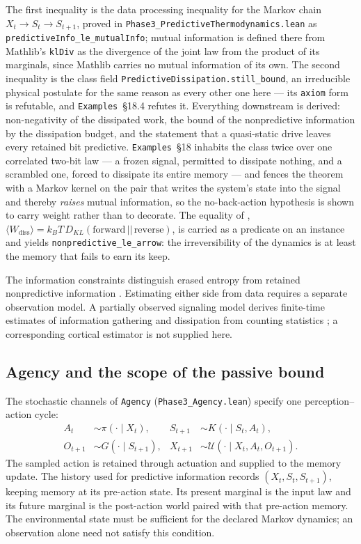 \documentclass{article}
\renewcommand{\cite}[1]{\citep{#1}}
\begin{document}
The first inequality is the data processing inequality for the Markov chain $X_t \to S_t \to S_{t+1}$, proved in \nolinkurl{Phase3_PredictiveThermodynamics.lean} as \nolinkurl{predictiveInfo_le_mutualInfo}; mutual information is defined there from Mathlib's \texttt{klDiv} as the divergence of the joint law from the product of its marginals, since Mathlib carries no mutual information of its own. The second inequality is the class field \nolinkurl{PredictiveDissipation.still_bound}, an irreducible physical postulate for the same reason as every other one here --- its \texttt{axiom} form is refutable, and \texttt{Examples}~\S18.4 refutes it. Everything downstream is derived: non-negativity of the dissipated work, the bound of the nonpredictive information by the dissipation budget, and the statement that a quasi-static drive leaves every retained bit predictive. \texttt{Examples}~\S18 inhabits the class twice over one correlated two-bit law --- a frozen signal, permitted to dissipate nothing, and a scrambled one, forced to dissipate its entire memory --- and fences the theorem with a Markov kernel on the pair that writes the system's state into the signal and thereby \emph{raises} mutual information, so the no-back-action hypothesis is shown to carry weight rather than to decorate. The equality of \cite{kawai2007}, $\langle W_{\mathrm{diss}} \rangle = k_B T\, D_{KL}(\mathrm{forward} \,||\, \mathrm{reverse})$, is carried as a predicate on an instance and yields \nolinkurl{nonpredictive_le_arrow}: the irreversibility of the dynamics is at least the memory that fails to earn its keep.

The information constraints distinguish erased entropy from retained nonpredictive information \cite{rosas2026}. Estimating either side from data requires a separate observation model. A partially observed signaling model derives finite-time estimates of information gathering and dissipation from counting statistics \cite{nicoletti2026}; a corresponding cortical estimator is not supplied here.

\subsection{Agency and the scope of the passive bound}
\label{sec:agency}

The stochastic channels of \texttt{Agency} (\nolinkurl{Phase3_Agency.lean}) specify one perception--action cycle:
\begin{align*}
 A_t&\sim\pi(\cdot\mid X_t),&
 S_{t+1}&\sim K(\cdot\mid S_t,A_t),\\
 O_{t+1}&\sim G(\cdot\mid S_{t+1}),&
 X_{t+1}&\sim \mathcal{U}(\cdot\mid X_t,A_t,O_{t+1}).
\end{align*}
The sampled action is retained through actuation and supplied to the memory update. The history used for predictive information records $(X_t,S_t,S_{t+1})$, keeping memory at its pre-action state. Its present marginal is the input law and its future marginal is the post-action world paired with that pre-action memory. The environmental state must be sufficient for the declared Markov dynamics; an observation alone need not satisfy this condition.
\end{document}
